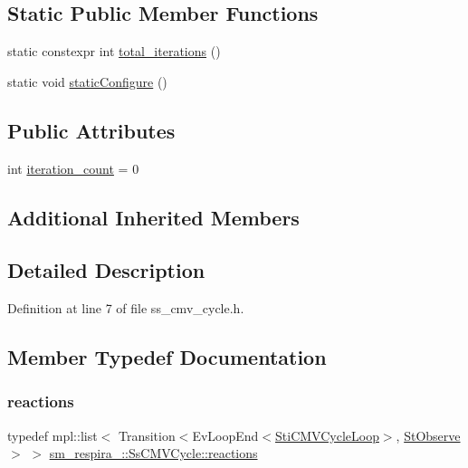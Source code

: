 \subsection*{Static Public Member Functions}
\begin{DoxyCompactItemize}
\item 
static constexpr int \hyperlink{structsm__respira__1_1_1SsCMVCycle_af33c1d460dcea6c9dd5275f860b53aee}{total\+\_\+iterations} ()
\item 
static void \hyperlink{structsm__respira__1_1_1SsCMVCycle_a83814dc5a1607704f1ca38cd205dc329}{static\+Configure} ()
\end{DoxyCompactItemize}
\subsection*{Public Attributes}
\begin{DoxyCompactItemize}
\item 
int \hyperlink{structsm__respira__1_1_1SsCMVCycle_a201c2de59431e5e5db575bede83a9f57}{iteration\+\_\+count} = 0
\end{DoxyCompactItemize}
\subsection*{Additional Inherited Members}


\subsection{Detailed Description}


Definition at line 7 of file ss\+\_\+cmv\+\_\+cycle.\+h.



\subsection{Member Typedef Documentation}
\mbox{\label{structsm__respira__1_1_1SsCMVCycle_ae7a341d2159261c69bcb6bda3ac6a71e}} 
\subsubsection{\texorpdfstring{reactions}{reactions}}
{\footnotesize\ttfamily typedef mpl\+::list$<$ Transition$<$Ev\+Loop\+End$<$\hyperlink{structsm__respira__1_1_1cmv__cycle__inner__states_1_1StiCMVCycleLoop}{Sti\+C\+M\+V\+Cycle\+Loop}$>$, \hyperlink{structsm__respira__1_1_1StObserve}{St\+Observe}$>$ $>$ \hyperlink{structsm__respira__1_1_1SsCMVCycle_ae7a341d2159261c69bcb6bda3ac6a71e}{sm\+\_\+respira\+\_\+::\+Ss\+C\+M\+V\+Cycle\+::reactions}}



